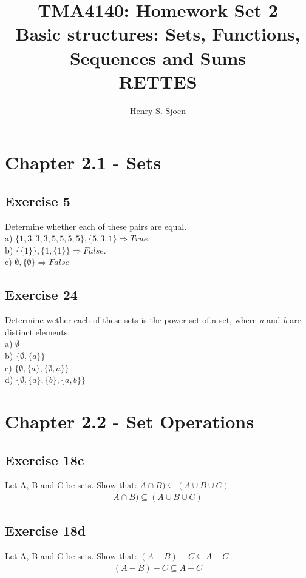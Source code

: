 \documentclass[12pt]{article}
\author{Henry S. Sjoen}
\title{%
  TMA4140: Homework Set 2\\
  Basic structures: Sets, Functions, Sequences and Sums\\
  \textbf{RETTES}
  }
\begin{document}
      \maketitle
      \tableofcontents
      
    \section{Chapter 2.1 - Sets}
    \subsection{Exercise 5}
    Determine whether each of these pairs are equal.\\
        a) $\{1,3,3,3,5,5,5,5\},\{5,3,1\} \Rightarrow True$.\\
        b) $\{\{1\}\},\{1,\{1\}\} \Rightarrow False.$\\
        c) $\emptyset,\{\emptyset\} \Rightarrow False$
   
    \subsection{Exercise 24}
    Determine wether each of these sets is the power set of a set, where \emph{a} and \emph{b} are distinct elements.\\
        a) $\emptyset$\\
        b) $\{\emptyset,\{a\}\}$\\
        c) $\{\emptyset, \{a\},\{\emptyset,a\}\}$\\
        d) $\{\emptyset,\{a\},\{b\},\{a,b\}\}$

    \section{Chapter 2.2 - Set Operations}
    \subsection{Exercise 18c}
    Let A, B and C be sets. Show that:
    $A \cap B) \subseteq (A \cup B \cup C)$
    \begin{equation}
        \begin{split}
            A \cap B) \subseteq (A \cup B \cup C)
        \end{split}
    \end{equation}
    \subsection{Exercise 18d}
    Let A, B and C be sets. Show that:
    $(A - B) - C \subseteq A - C$
    \begin{equation}
        \begin{split}
            (A - B) - C \subseteq A - C
        \end{split}
    \end{equation}
\end{document}
